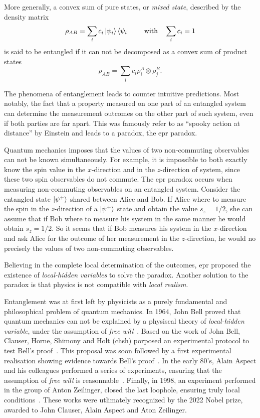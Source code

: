 More generally, a convex sum of pure states, or \textit{mixed state}, described by the density matrix
\begin{equation}
	\rho_{AB} = \sum_i c_i \ket{\psi_i} \bra{\psi_i} \qquad \text{with} \quad \sum_i c_i = 1
	\label{eq:mixed_state}
\end{equation}
is said to be entangled if it can not be decomposed as a convex sum of product states
\begin{equation}
	\rho_{AB} = \sum_i c_i \rho^A_i \otimes \rho^B_j.
	\label{eq:product_state}
\end{equation}

\medbreak
The phenomena of entanglement leads to counter intuitive predictions. 
Most notably, the fact that a property measured on one part of an entangled system can determine the measurement outcomes on the other part of such system, even if both parties are far apart. 
This was famously refer to as \enquote{spooky action at distance} by Einstein and leads to a paradox, the \acrshort{epr} paradox.

Quantum mechanics imposes that the values of two non-commuting observables can not be known simultaneously. 
For example, it is impossible to both exactly know the spin value in the $x$-direction and in the $z$-direction of system, since these two spin observables do not commute.
The \acrshort{epr} paradox occurs when measuring non-commuting observables on an entangled system.
Consider the entangled state $\ket{\psi^+}$ shared between Alice and Bob.
If Alice where to measure the spin in the $z$-direction of a $\ket{\psi^+}$ state and obtain the value $s_z = 1/2$, she can assume that if Bob where to measure his system in the same manner he would obtain $s_z = 1/2$. 
So it seems that if Bob measures his system in the $x$-direction and ask Alice for the outcome of her measurement in the $z$-direction, he would no precisely the values of two non-commuting observables.

Believing in the complete local determination of the outcomes, \acrlong{epr} proposed the existence of \textit{local-hidden variables} to solve the paradox. Another solution to the paradox is that physics is not compatible with \textit{local realism}.

\medbreak
Entanglement was at first left by physicists as a purely fundamental and philosophical problem of quantum mechanics.
In 1964, John Bell proved that quantum mechanics can not be explained by a physiscal theory of \textit{local-hidden variable}, under the assumption of \textit{free will}~\cite{Bell1964}. 
Based on the work of John Bell, Clauser, Horne, Shimony and Holt (\acrshort{chsh}) porposed an experimental protocol to test Bell's proof~\cite{Clauser1969}. 
This proposal was soon followed by a first experimental realisation showing evidence towards Bell's proof~\cite{Freedman1972}.
In the early 80's, Alain Aspect and his colleagues performed a series of experiments, ensuring that the assumption of \textit{free will} is reasonnable~\cite{Aspect1982}.
Finally, in 1998, an experiment performed in the group of Anton Zeilinger, closed the last loophole, ensuring truly local conditions~\cite{Weihs1998}.
These works were utlimately recognized by the 2022 Nobel prize, awarded to John Clauser, Alain Aspect and Aton Zeilinger.

